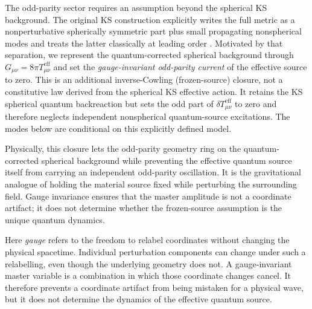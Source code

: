 \documentclass[12pt,a4paper]{article}
\begin{document}
The odd-parity sector requires an assumption beyond the spherical KS
background.  The original KS construction explicitly writes the full metric
as a nonperturbative spherically symmetric part plus small propagating
nonspherical modes and treats the latter classically at leading order
\cite{Kazakov1994}.  Motivated by that separation, we represent the
quantum-corrected spherical background through
\(G_{\mu\nu}=8\pi T^{\mathrm{eff}}_{\mu\nu}\) and set the
\emph{gauge-invariant odd-parity current} of the effective source to zero.
This is an additional inverse-Cowling (frozen-source) closure, not a
constitutive law derived from the spherical KS effective action.  It retains
the KS spherical quantum backreaction but sets the odd part of
\(\delta T^{\mathrm{eff}}_{\mu\nu}\) to zero and therefore neglects
independent nonspherical quantum-source excitations.  The modes below are
conditional on this explicitly defined model.

Physically, this closure lets the odd-parity geometry ring on the
quantum-corrected spherical background while preventing the effective quantum
source itself from carrying an independent odd-parity oscillation.  It is the
gravitational analogue of holding the material source fixed while perturbing
the surrounding field.  Gauge invariance ensures that the master amplitude is
not a coordinate artifact; it does not determine whether the frozen-source
assumption is the unique quantum dynamics.

Here \emph{gauge} refers to the freedom to relabel coordinates without
changing the physical spacetime.  Individual perturbation components can
change under such a relabelling, even though the underlying geometry does not.
A gauge-invariant master variable is a combination in which those coordinate
changes cancel.  It therefore prevents a coordinate artifact from being
mistaken for a physical wave, but it does not determine the dynamics of the
effective quantum source.
\end{document}
